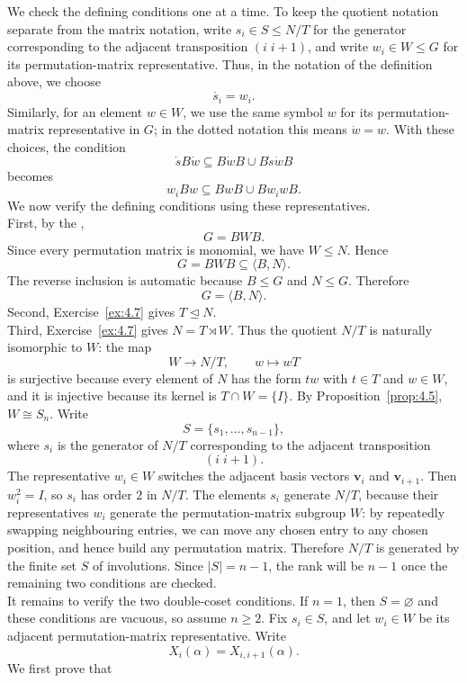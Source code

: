 \documentclass[../Odyssey_Project.tex]{subfiles}
\begin{document}
\begin{solution}
We check the defining conditions one at a time. To keep the quotient notation separate from the matrix notation, write $s_i\in S\leq N/T$ for the generator corresponding to the adjacent transposition $(i\;i+1)$, and write $w_i\in W\leq G$ for its permutation-matrix representative. Thus, in the notation of the definition above, we choose
\[
    \dot{s_i}=w_i.
\]
Similarly, for an element $w\in W$, we use the same symbol $w$ for its permutation-matrix representative in $G$; in the dotted notation this means $\dot{w}=w$. With these choices, the condition
\[
    \dot{s}B\dot{w}\subseteq B\dot{w}B\cup B\dot{s}\dot{w}B
\]
becomes
\[
    w_iBw\subseteq BwB\cup Bw_iwB.
\]
We now verify the defining conditions using these representatives.\\
First, by the ,
\[
    G=BWB.
\]
Since every permutation matrix is monomial, we have $W\leq N$. Hence
\[
    G=BWB\subseteq \langle B,N\rangle.
\]
The reverse inclusion is automatic because $B\leq G$ and $N\leq G$. Therefore
\[
    G=\langle B,N\rangle.
\]
Second, Exercise~\ref{ex:4.7} gives $T\trianglelefteq N$.\\
Third, Exercise~\ref{ex:4.7} gives $N=T\rtimes W$. Thus the quotient $N/T$ is naturally isomorphic to $W$: the map
\[
    W\to N/T,\qquad w\mapsto wT
\]
is surjective because every element of $N$ has the form $tw$ with $t\in T$ and $w\in W$, and it is injective because its kernel is $T\cap W=\{I\}$. By Proposition~\ref{prop:4.5}, $W\cong S_n$. Write
\[
    S=\{s_1,\ldots,s_{n-1}\},
\]
where $s_i$ is the generator of $N/T$ corresponding to the adjacent transposition
\[
    (i\;i+1).
\]
The representative $w_i\in W$ switches the adjacent basis vectors $\mathbf v_i$ and $\mathbf v_{i+1}$. Then $w_i^2=I$, so $s_i$ has order $2$ in $N/T$. The elements $s_i$ generate $N/T$, because their representatives $w_i$ generate the permutation-matrix subgroup $W$: by repeatedly swapping neighbouring entries, we can move any chosen entry to any chosen position, and hence build any permutation matrix. Therefore $N/T$ is generated by the finite set $S$ of involutions. Since $|S|=n-1$, the rank will be $n-1$ once the remaining two conditions are checked.\\
It remains to verify the two double-coset conditions. If $n=1$, then $S=\varnothing$ and these conditions are vacuous, so assume $n\geq2$. Fix $s_i\in S$, and let $w_i\in W$ be its adjacent permutation-matrix representative. Write
\[
    X_i(\alpha)=X_{i,i+1}(\alpha).
\]
We first prove that

\end{solution}
\end{document}
